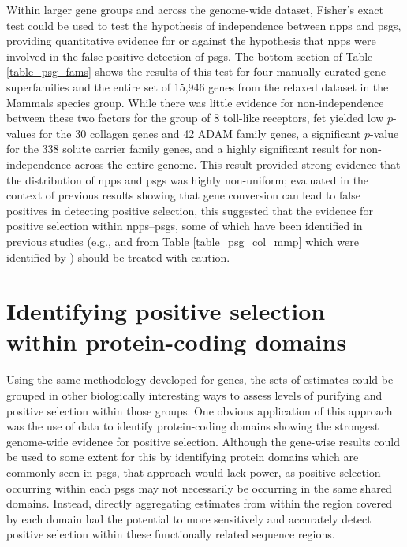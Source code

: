Within larger gene groups and across the genome-wide dataset, Fisher's
exact test could be used to test the hypothesis of independence
between \acp{npp} and \acp{psg}, providing quantitative evidence for
or against the hypothesis that \acp{npp} were involved in the false
positive detection of \acp{psg}. The bottom section of Table
\ref{table_psg_fams} shows the results of this test for four
manually-curated gene superfamilies and the entire set of 15,946 genes
from the relaxed dataset in the Mammals species group. While there was
little evidence for non-independence between these two factors for the
group of 8 toll-like receptors, \ac{fet} yielded low $p$-values for
the 30 collagen genes and 42 ADAM family genes, a significant
$p$-value for the 338 solute carrier family genes, and a highly
significant result for non-independence across the entire genome. This
result provided strong evidence that the distribution of \acp{npp} and
\acp{psg} was highly non-uniform; evaluated in the context of previous
results showing that gene conversion can lead to false positives in
detecting positive selection, this suggested that the evidence for
positive selection within \acp{npp}--\acp{psg}, some of which have
been identified in previous studies (e.g.,  and
 from Table \ref{table_psg_col_mmp} which were identified
by \citet{Kosiol2008}) should be treated with caution.

\section{Identifying positive selection within protein-coding domains}

Using the same methodology developed for genes, the sets of \sw
estimates could be grouped in other biologically interesting ways to
assess levels of purifying and positive selection within those
groups. One obvious application of this approach was the use of \sw
data to identify protein-coding domains showing the strongest
genome-wide evidence for positive selection. Although the gene-wise
results could be used to some extent for this by identifying protein
domains which are commonly seen in \acp{psg}, that approach would lack
power, as positive selection occurring within each \acp{psg} may not
necessarily be occurring in the same shared domains. Instead, directly
aggregating \sw estimates from within the region covered by each
domain had the potential to more sensitively and accurately detect
positive selection within these functionally related sequence regions.


